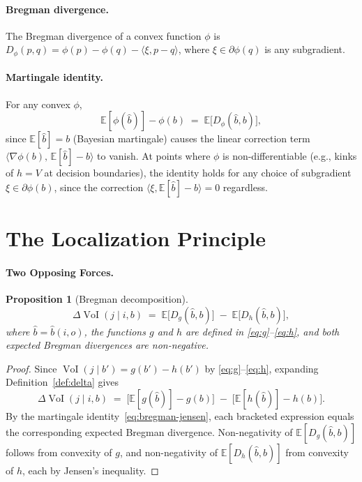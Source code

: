 \documentclass{article}
\newcommand{\VoI}{\operatorname{VoI}}
\newcommand{\bpost}{\hat{b}}
\newcommand{\E}{\mathbb{E}}
\newcommand{\Dg}{D_g}
\newcommand{\Dh}{D_h}
\newtheorem{proposition}[theorem]{Proposition}
\begin{document}
\paragraph{Bregman divergence.}
The Bregman divergence of a convex function $\phi$ is
$D_\phi(p, q) = \phi(p) - \phi(q) - \langle \xi, p - q\rangle$,
where $\xi \in \partial\phi(q)$ is any subgradient.

\paragraph{Martingale identity.}
For any convex $\phi$,
\begin{equation}
  \label{eq:bregman-jensen}
  \E[\phi(\bpost)] - \phi(b)
  \;=\;
  \E\bigl[D_\phi(\bpost, b)\bigr],
\end{equation}
since $\E[\bpost] = b$ (Bayesian martingale) causes the linear correction term $\langle \nabla\phi(b),\, \E[\bpost] - b \rangle$ to vanish.
At points where $\phi$ is non-differentiable (e.g., kinks of $h = V$ at decision boundaries), the identity holds for any choice of subgradient $\xi \in \partial\phi(b)$, since the correction $\langle \xi, \E[\bpost] - b \rangle = 0$ regardless.

\section{The Localization Principle}
\label{sec:localization}

\paragraph{Two Opposing Forces.}

\begin{proposition}[Bregman decomposition]
\label{prop:decomposition}
\[
  \Delta\VoI(j \mid i, b)
  \;=\;
  \E\bigl[\Dg(\bpost, b)\bigr]
  \;-\;
  \E\bigl[\Dh(\bpost, b)\bigr],
\]
where $\bpost = \bpost(i, o)$, the functions $g$ and $h$ are defined in \eqref{eq:g}--\eqref{eq:h}, and both expected Bregman divergences are non-negative.
\end{proposition}

\begin{proof}
Since $\VoI(j \mid b') = g(b') - h(b')$ by \eqref{eq:g}--\eqref{eq:h}, expanding Definition~\ref{def:delta} gives
\[
  \Delta\VoI(j \mid i, b)
  \;=\;
  \bigl[\E[g(\bpost)] - g(b)\bigr]
  \;-\;
  \bigl[\E[h(\bpost)] - h(b)\bigr].
\]
By the martingale identity~\eqref{eq:bregman-jensen}, each bracketed expression equals the corresponding expected Bregman divergence.
Non-negativity of $\E[\Dg(\bpost, b)]$ follows from convexity of $g$, and non-negativity of $\E[\Dh(\bpost, b)]$ from convexity of $h$, each by Jensen's inequality.
\end{proof}
\end{document}

